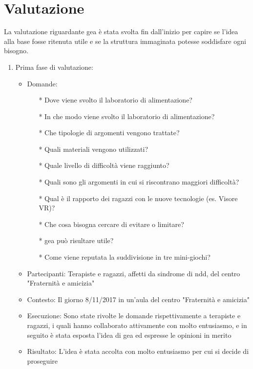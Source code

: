 \section{Valutazione} \label{sec:val}

La valutazione riguardante \acs{gea} è stata svolta fin dall'inizio per capire se l'idea alla base fosse ritenuta utile e se la struttura immaginata potesse soddisfare ogni bisogno.
\begin{enumerate}
\item Prima fase di valutazione:
		\begin{itemize}
		\item Domande: 	\begin{itemize}
						\item[*] Dove viene svolto il laboratorio di alimentazione?
						\item[*] In che modo viene svolto il laboratorio di alimentazione?
						\item[*] Che tipologie di argomenti vengono trattate?
						\item[*] Quali materiali vengono utilizzati?
						\item[*] Quale livello di difficoltà viene raggiunto?
						\item[*] Quali sono gli argomenti in cui si riscontrano maggiori difficoltà?
						\item[*] Qual è il rapporto dei ragazzi con le nuove tecnologie (es. Visore VR)?
						\item[*] Che cosa bisogna cercare di evitare o limitare?
						\item[*] \acs{gea} può risultare utile?
						\item[*] Come viene reputata la suddivisione in tre mini-giochi?		
						\end{itemize}
		\item Partecipanti: Terapiste e ragazzi, affetti da sindrome di \acs{ndd}, del centro "Fraternità 								e amicizia"
		\item Contesto: Il giorno 8/11/2017 in un'aula del centro "Fraternità e amicizia"
		\item Esecuzione: Sono state rivolte le domande rispettivamente a terapiste e ragazzi, i quali 								  hanno collaborato attivamente con molto entusiasmo, e in seguito è stata esposta 						  l'idea di \acs{gea} ed espresse le opinioni in merito 
		\item Risultato: L'idea è stata accolta con molto entusiasmo per cui si decide di proseguire  

\end{itemize}
\end{enumerate}
